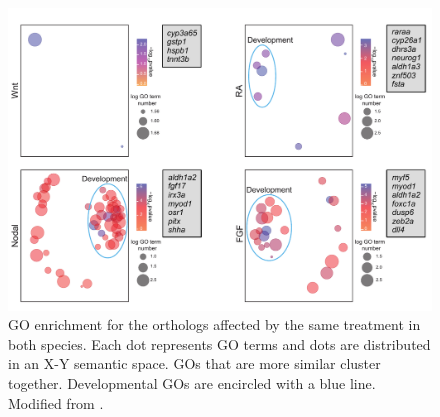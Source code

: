 \begin{figure}[h]
\centering
\includegraphics[width=1\textwidth]{Figures/fib1b_GO_common_orthologs}
\caption[GO term enrichment of the commonly affected orthologs]{
GO enrichment for the orthologs affected by the same treatment in both species. Each dot represents GO terms and dots are distributed in an X-Y semantic space. GOs that are more similar cluster together. Developmental GOs are encircled with a blue line.  Modified from \parencite{gil-galvez_gain_2022}.
}
\label{fig:common_affected_genes}
\end{figure} 


